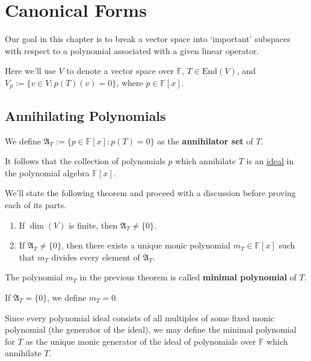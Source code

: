 \chapter{Canonical Forms}

Our goal in this chapter is to break a vector space into `important' subspaces with respect to a polynomial associated with a given linear operator.

Here we'll use $V$ to denote a vector space over $\mathbb{F}$, $T \in \text{End}(V)$, and $V_p := \{ v \in V : p(T)(v) = 0 \}$, where $p \in \mathbb{F}[x]$.

\section{Annihilating Polynomials}

\begin{definition}
	We define $\mathfrak{A}_T := \{ p \in \mathbb{F}[x] : p(T) = 0 \}$ as the \textbf{annihilator set} of $T$.
\end{definition}

It follows that the collection of polynomials $p$ which annihilate $T$ is an \hyperref[def:ideal]{ideal} in the polynomial algebra $\mathbb{F}[x]$.

We'll state the following theorem and proceed with a discussion before proving each of its parts.

\begin{theorem}\label{thm:minimal-polynomial} \hfill
	\begin{enumerate}
		\item If $\dim (V)$ is finite, then $\mathfrak{A}_T \neq \{ 0 \}$.
		\item If $\mathfrak{A}_T \neq \{ 0 \}$, then there exists a unique monic polynomial $m_T \in \mathbb{F}[x]$ such that $m_T$ divides every element of $\mathfrak{A}_T$.
	\end{enumerate}
\end{theorem}

\begin{definition}
	The polynomial $m_T$ in the previous theorem is called \textbf{minimal polynomial} of $T$.
	
	If $\mathfrak{A}_T = \{ 0 \}$, we define $m_T = 0$.
\end{definition}

Since every polynomial ideal consists of all multiples of some fixed monic polynomial (the generator of the ideal), we may define the minimal polynomial for $T$ as the unique monic generator of the ideal of polynomials over $\mathbb{F}$ which annihilate $T$.

